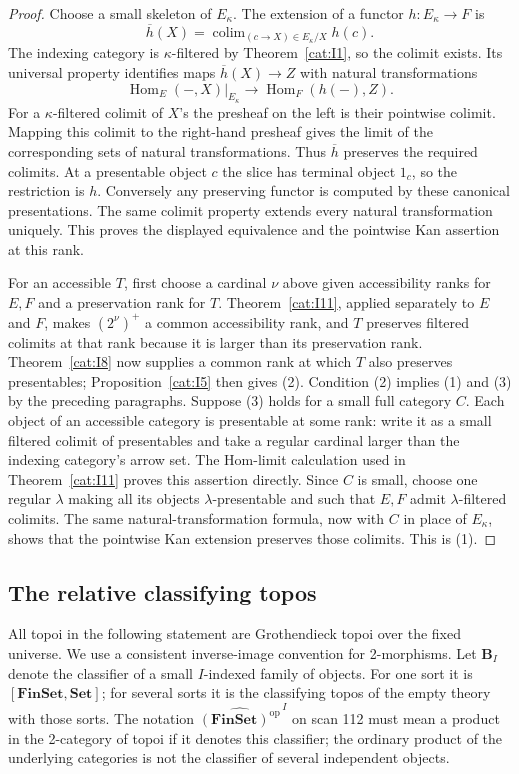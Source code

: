 \begin{proof}
Choose a small skeleton of $E_\kappa$.  The extension of a functor
$h:E_\kappa\to F$ is
\[
 \overline h(X)=\operatorname{colim}_{(c\to X)\in E_\kappa/X}h(c).
\]
The indexing category is $\kappa$-filtered by
Theorem~\ref{cat:I1}, so the colimit exists.  Its universal property
identifies maps $\overline h(X)\to Z$ with natural transformations
\[
 \operatorname{Hom}_E(-,X)|_{E_\kappa}
       \longrightarrow \operatorname{Hom}_F(h(-),Z).
\]
For a $\kappa$-filtered colimit of $X$'s the presheaf on the left is
their pointwise colimit.  Mapping this colimit to the right-hand
presheaf gives the limit of the corresponding sets of natural
transformations.  Thus $\overline h$ preserves the required colimits.
At a presentable object $c$ the slice has terminal object $1_c$, so
the restriction is $h$.  Conversely any preserving functor is
computed by these canonical presentations.  The same colimit
property extends every natural transformation uniquely.  This proves
the displayed equivalence and the pointwise Kan assertion at this rank.

For an accessible $T$, first choose a cardinal $\nu$ above given
accessibility ranks for $E,F$ and a preservation rank for $T$.
Theorem~\ref{cat:I11}, applied separately to $E$ and $F$, makes
$(2^\nu)^+$ a common accessibility rank, and $T$ preserves filtered
colimits at that rank because it is larger than its preservation rank.
Theorem~\ref{cat:I8} now supplies a common rank
at which $T$ also preserves presentables; Proposition~\ref{cat:I5}
then gives (2).  Condition (2) implies (1) and (3) by the preceding
paragraphs.
Suppose (3) holds for a small full category $C$.  Each object of an
accessible category is presentable at some rank: write it as a small
filtered colimit of presentables and take a regular cardinal larger
than the indexing category's arrow set.  The Hom-limit calculation
used in Theorem~\ref{cat:I11} proves this assertion directly.
Since $C$ is small, choose one regular $\lambda$ making all its
objects $\lambda$-presentable and such that $E,F$ admit
$\lambda$-filtered colimits.  The same natural-transformation formula,
now with $C$ in place of $E_\kappa$, shows that the pointwise Kan
extension preserves those colimits.  This is (1).
\end{proof}


\subsection{The relative classifying topos}
All topoi in the following statement are Grothendieck topoi over the
fixed universe.  We use a consistent inverse-image convention for
2-morphisms.  Let $\mathbf B_I$ denote the classifier of a small
$I$-indexed family of objects.  For one sort it is
$[\mathbf{FinSet},\mathbf{Set}]$; for several sorts it is the
classifying topos of the empty theory with those sorts.  The notation
$\widehat{(\mathbf{FinSet})^{\mathrm{op}}}^{\,I}$ on scan 112 must
mean a product in the 2-category of topoi if it denotes this
classifier; the ordinary product of the underlying categories is
not the classifier of several independent objects.

